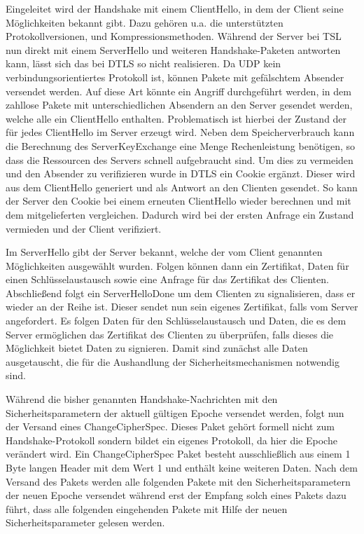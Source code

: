 Eingeleitet wird der Handshake mit einem ClientHello, in dem der Client seine Möglichkeiten bekannt gibt. Dazu gehören u.a. die unterstützten Protokollversionen, 
und Kompressionsmethoden. Während der Server bei TSL nun direkt mit einem ServerHello und weiteren Handshake-Paketen antworten kann, lässt sich das bei DTLS so nicht
realisieren. Da UDP kein verbindungsorientiertes Protokoll ist, können Pakete mit gefälschtem Absender versendet werden. Auf diese Art könnte ein  Angriff
durchgeführt werden, in dem zahllose Pakete mit unterschiedlichen Absendern an den Server gesendet werden, welche alle ein ClientHello enthalten. Problematisch ist
hierbei der Zustand der für jedes ClientHello im Server erzeugt wird. Neben dem Speicherverbrauch kann die Berechnung des ServerKeyExchange eine Menge Rechenleistung
benötigen, so dass die Ressourcen des Servers schnell aufgebraucht sind. Um dies zu vermeiden und den Absender zu verifizieren wurde in DTLS ein Cookie ergänzt.
Dieser wird aus dem ClientHello generiert und als Antwort an den Clienten gesendet. So kann der Server den Cookie bei einem erneuten ClientHello wieder berechnen
und mit dem mitgelieferten vergleichen. Dadurch wird bei der ersten Anfrage ein Zustand vermieden und der Client verifiziert. 

Im ServerHello gibt der Server bekannt, welche der vom Client genannten Möglichkeiten ausgewählt wurden. Folgen können dann ein Zertifikat, Daten für einen Schlüsselaustausch
sowie eine Anfrage für das Zertifikat des Clienten. Abschließend folgt ein ServerHelloDone um dem Clienten zu signalisieren, dass er wieder an der Reihe ist. Dieser sendet
nun sein eigenes Zertifikat, falls vom Server angefordert. Es folgen Daten für den Schlüsselaustausch und Daten, die es dem Server ermöglichen das Zertifikat des Clienten
zu überprüfen, falls dieses die Möglichkeit bietet Daten zu signieren. Damit sind zunächst alle Daten ausgetauscht, die für die Aushandlung der Sicherheitsmechanismen
notwendig sind.

Während die bisher genannten Handshake-Nachrichten mit den Sicherheitsparametern der aktuell gültigen Epoche versendet werden, folgt nun der Versand eines
ChangeCipherSpec. Dieses Paket gehört formell nicht zum Handshake-Protokoll sondern bildet ein eigenes Protokoll, da hier die Epoche verändert wird.
Ein ChangeCipherSpec Paket besteht ausschließlich aus einem 1 Byte langen Header mit dem Wert 1 und enthält keine weiteren Daten.
Nach dem Versand des Pakets werden alle folgenden Pakete mit den Sicherheitsparametern der neuen Epoche versendet während erst der Empfang solch eines
Pakets dazu führt, dass alle folgenden eingehenden Pakete mit Hilfe der neuen Sicherheitsparameter gelesen werden.

